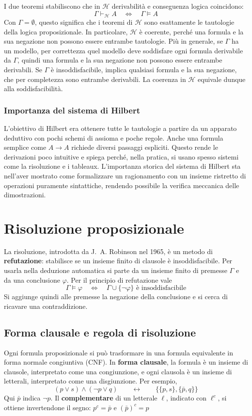 \medskip
\noindent
I due teoremi stabiliscono che in $\mathcal{H}$ derivabilità e
conseguenza logica coincidono:
\[
    \Gamma\vdash_{\mathcal{H}} A
    \quad\Longleftrightarrow\quad
    \Gamma\models A
\]
Con $\Gamma=\emptyset$, questo significa che i teoremi di
$\mathcal{H}$ sono esattamente le tautologie della logica
proposizionale. In particolare, $\mathcal{H}$ è coerente, perché
una formula e la sua negazione non possono essere entrambe
tautologie. Più in generale, se $\Gamma$ ha un modello, per
correttezza quel modello deve soddisfare ogni formula derivabile
da $\Gamma$, quindi una formula e la sua negazione non possono essere
entrambe derivabili. Se $\Gamma$ è insoddisfacibile, implica
qualsiasi formula e la sua negazione, che per completezza sono
entrambe derivabili. La coerenza in $\mathcal{H}$ equivale dunque
alla soddisfacibilità.

\subsubsection*{Importanza del sistema di Hilbert}
L'obiettivo di Hilbert era ottenere tutte le tautologie a partire
da un apparato deduttivo con pochi schemi di assioma e poche regole.
Anche una formula semplice come $A\to A$ richiede diversi passaggi
espliciti. Questo rende le derivazioni poco intuitive e spiega
perché, nella pratica, si usano spesso sistemi come la risoluzione
e i tableaux. L'importanza storica del sistema di Hilbert sta
nell'aver mostrato come formalizzare un ragionamento con un
insieme ristretto di operazioni puramente sintattiche, rendendo
possibile la verifica meccanica delle dimostrazioni.

\section{Risoluzione proposizionale}
La risoluzione, introdotta da J.~A. Robinson nel 1965, è un metodo
di \textbf{refutazione}: stabilisce se un insieme finito di clausole
è insoddisfacibile. Per usarla nella deduzione automatica si parte
da un insieme finito di premesse $\Gamma$ e da una conclusione
$\varphi$. Per il principio di refutazione vale
\[
    \Gamma\models\varphi
    \quad\Longleftrightarrow\quad
    \Gamma\cup\{\neg\varphi\}\text{ è insoddisfacibile}
\]
Si aggiunge quindi alle premesse la negazione della conclusione e
si cerca di ricavare una contraddizione.

\subsection{Forma clausale e regola di risoluzione}
Ogni formula proposizionale si può trasformare in una formula
equivalente in forma normale congiuntiva (CNF). In \textbf{forma
clausale}, la formula è un insieme di clausole, interpretato come
una congiunzione, e ogni clausola è un insieme di letterali,
interpretato come una disgiunzione. Per esempio,
\[
    (p\vee s)\wedge(\neg p\vee q)
    \qquad\longleftrightarrow\qquad
    \bigl\{\{p,s\},\{\bar p,q\}\bigr\}
\]
Qui $\bar p$ indica $\neg p$. Il \textbf{complementare} di un
letterale $\ell$, indicato con $\ell^c$, si ottiene invertendone
il segno: $p^c=\bar p$ e $(\bar p)^c=p$

